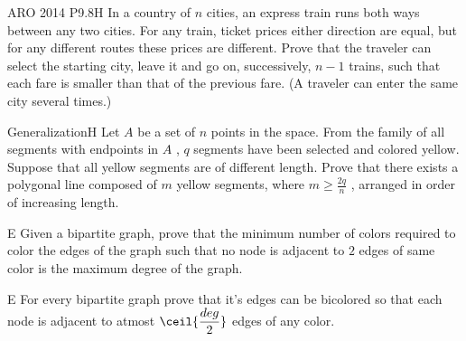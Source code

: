 

{ARO 2014 P9.8}{H}{
    In a country of $ n $ cities, an express train runs both ways between any
    two cities. For any train, ticket prices either direction are equal, but
    for any different routes these prices are different. Prove that the
    traveler can select the starting city, leave it and go on, successively, $
    n-1 $ trains, such that each fare is smaller than that of the previous
    fare. (A traveler can enter the same city several times.)
}\label{tickets}


{Generalization}{H}{
    Let $ A $ be a set of $ n $ points in the space. From the family of all
    segments with endpoints in $ A $ , $ q $ segments have been selected and
    colored yellow. Suppose that all yellow segments are of different length.
    Prove that there exists a polygonal line composed of $ m $ yellow
    segments, where $ m\geq\frac{2q}{n} $ , arranged in order of increasing
    length.
}\label{problem:constructive_algo_9}\label{problem:swapping_4}




\prob{}
{}{E}{
    Given a bipartite graph, prove that the minimum number of colors required
    to color the edges of the graph such that no node is adjacent to $ 2 $
    edges of same color is the maximum degree of the graph.
}\label{problem:bipartite_graph_3}


\prob{}
{}{E}{
    For every bipartite graph prove that it's edges can be bicolored so that each
    node is adjacent to atmost $ \ceil{\dfrac{deg}{2}} $ edges of  any color.
}\label{problem:bipartite_graph_4}








